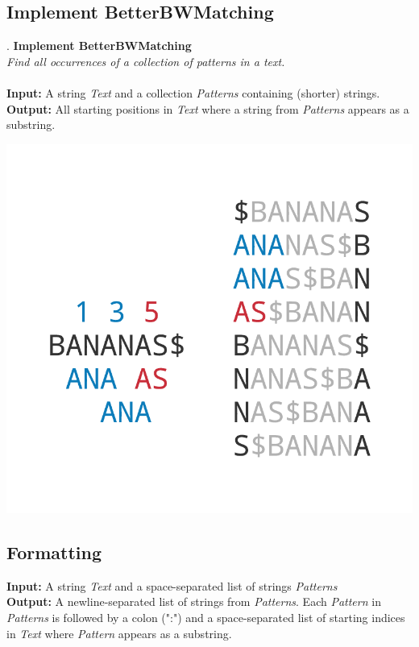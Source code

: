 \documentclass{article}
\begin{document}
\subsection{Implement BetterBWMatching}.
\hline\vspace{5}
\noindent\textbf{Implement BetterBWMatching}\\
\emph{Find all occurrences of a collection of patterns in a text.}\\ \\
\textbf{Input:} A string \emph{Text} and a collection \emph{Patterns} containing (shorter) strings. \\
\textbf{Output:} All starting positions in \emph{Text} where a string from \emph{Patterns} appears as a substring.
\begin{center}
    \includegraphics[scale=0.2]{logos/9LMN.png} 
\end{center}
\hline\vspace{5}

\subsection*{Formatting}
\textbf{Input:} A string \emph{Text} and a space-separated list of strings \emph{Patterns}\\
\noindent\textbf{Output:} A newline-separated list of strings from \emph{Patterns}. Each \emph{Pattern} in \emph{Patterns} is followed by a colon (":") and a space-separated list of starting indices in \emph{Text} where \emph{Pattern} appears as a substring.
\end{document}
